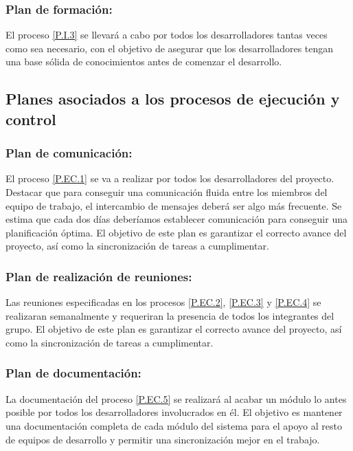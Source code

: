 \documentclass{article}
\begin{document}
\subsubsection{Plan de formación:} \label{PL.I.3}

El proceso \ref{P.I.3} se llevará a cabo por todos los desarrolladores tantas veces como sea necesario, con el objetivo de asegurar que los desarrolladores tengan una base sólida de conocimientos antes de comenzar el desarrollo.

\subsection{Planes asociados a los procesos de ejecución y control}

\subsubsection{Plan de comunicación:} \label{PL.EC.1}

El proceso \ref{P.EC.1} se va a realizar por todos los desarrolladores del proyecto. Destacar que para conseguir una comunicación fluida entre los miembros del equipo de trabajo, el intercambio de mensajes deberá ser algo
más frecuente. Se estima que cada dos días deberíamos establecer comunicación para conseguir una planificación óptima.
El objetivo de este plan es garantizar el correcto avance del proyecto, así como la sincronización de tareas a cumplimentar.

\subsubsection{Plan de realización de reuniones:} \label{PL.EC.2} %

Las reuniones especificadas en los procesos \ref{P.EC.2}, \ref{P.EC.3} y \ref{P.EC.4} se realizaran semanalmente y requeriran la presencia de todos los integrantes del grupo. El objetivo de este plan es garantizar el correcto avance del proyecto, así como la sincronización de tareas a cumplimentar.

\subsubsection{Plan de documentación:} \label{PL.EC.3}

La documentación del proceso \ref{P.EC.5} se realizará al acabar un módulo lo antes posible por todos los desarrolladores involucrados en él. El objetivo es mantener una documentación completa de cada módulo del sistema para el apoyo al resto
de equipos de desarrollo y permitir una sincronización mejor en el trabajo.
\end{document}
